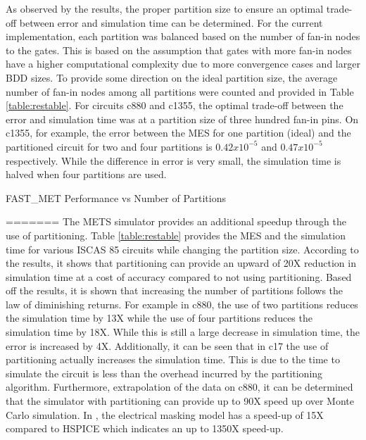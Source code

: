 \documentclass[conference]{IEEEtran}
\begin{document}
\begin{algorithm}
\begin{table}[ht]
\begin{center}
As observed by the results, the proper partition size to ensure an optimal trade-off between error and simulation time can be determined. For the current implementation, each partition was balanced based on the number of fan-in nodes to the gates. This is based on the assumption that gates with more fan-in nodes have a higher computational complexity due to more convergence cases and larger BDD sizes. To provide some direction on the ideal partition size, the average number of fan-in nodes among all partitions were counted and provided in Table \ref{table:restable}. For circuits c880 and c1355, the optimal trade-off between the error and simulation time was at a partition size of three hundred fan-in pins. On c1355, for example, the error between the MES for one partition (ideal) and the partitioned circuit for two and four partitions is $0.42x10^{-5}$ and $0.47x10^{-5}$ respectively. While the difference in error is very small, the simulation time is halved when four partitions are used. 

\begin{table}[ht]
	\begin{center}
		\caption{FAST\_MET Performance vs Number of Partitions}
=======
The METS simulator provides an additional speedup through the use of partitioning. Table \ref{table:restable} provides the MES and the simulation time for various ISCAS 85 circuits while changing the partition size. According to the results, it shows that partitioning can provide an upward of 20X reduction in simulation time at a cost of accuracy compared to not using partitioning. Based off the results, it is shown that increasing the number of partitions follows the law of diminishing returns. For example in c880, the use of two partitions reduces the simulation time by 13X while the use of four partitions reduces the simulation time by 18X. While this is still a large decrease in simulation time, the error is increased by 4X. Additionally, it can be seen that in c17 the use of partitioning actually increases the simulation time. This is due to the time to simulate the circuit is less than the overhead incurred by the partitioning algorithm. Furthermore, extrapolation of the data on c880, it can be determined that the simulator with partitioning can provide up to 90X speed up over Monte Carlo simulation. In \cite{Watkins2016}, the electrical masking model has a speed-up of 15X compared to HSPICE which indicates an up to 1350X speed-up.


\end{center}
\end{table}
\end{center}
\end{table}
\end{algorithm}
\end{document}
